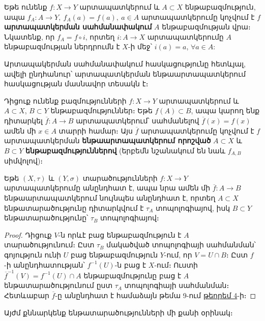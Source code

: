 \documentclass[./main.tex]{subfiles}
\begin{document}
\par Եթե ունենք $f: X\rightarrow Y$ արտապատկերում և $A \subset X$ ենթաբազմություն, ապա $f_A:A \rightarrow Y,\ f_A (a)=f(a),\ a \in A$ արտապատկերումը կոչվում է $f$ \textbf{արտապատկեր\-ման սահմանափակում}  $A$ ենթաբազմության վրա։ Նկատենք, որ $f_A=f\circ i$, որտեղ ${i:A \rightarrow X}$ արտապատկերումը $A$ ենթաբազմության ներդրումն է $X$-ի մեջ՝ $i(a)=a$, $\forall  a \in A$:

\par Արտապակերման սահմանափակում հասկացությունը հետևյալ, ավելի ընդ\-հա\-նուր՝ արտապատկերման ենթաարտապատկերում հասկացության մասնա\-վոր տե\-սակն է։

\par Դիցուք ունենք բազմությունների $f: X \to Y$ արտապատկերում և $A \subset X$, $B \subset Y$ ենթաբազմություններ։ Եթե $f(A) \subset B$, ապա կարող ենք դիտարկել ${\overline{f} : A \to B}$ արտա\-պատկերում՝ սահմանելով $\overline{f}(x) = f(x)$ ամեն մի ${x \in A}$ տարրի համար։ Այս \linebreak $\overline{f}$ արտապատկերումը կոչվում է $f$ արտապատկերման \textbf{ենթաարտապատկերում \linebreak որոշված} $A \subset X$ և $B \subset Y$ \textbf{ենթաբազմություններով} (երբեմն նշանակում են նաև $f_{A, B}$ սիմվոլով)։

\begin{theorem}\label{ch11thm1}
Եթե $(X, \tau)$ և $(Y, \sigma)$ տարածությունների $f : X \to Y$ արտապատ\-կերումը անընդհատ է, ապա նրա ամեն մի $\overline{f}: A \to B$ ենթաարտապատկերում նույնպես անընդհատ է, որտեղ $A \subset X$ ենթատարածությունը դիտարկվում է $\tau_A$ տոպոլոգիայով, իսկ $B \subset Y$ ենթատարածությունը՝ $\tau_B$ տոպոլոգիայով։
\end{theorem}

\begin{proof}
Դիցուք $V$-ն որևէ բաց ենթաբազմություն է $A$ տարածությունում։ Ըստ $\tau_B$ մակածված տոպոլոգիայի սահմանման՝ գոյություն ունի $U$ բաց ենթաբազ\-մություն $Y$-ում, որ $V = U \cap B$։ Ըստ $f$-ի անընդհատության՝ $f^{-1}(U)$-ն բաց է $X$-ում։ Ուստի $\overline{f}^{-1}(V) = f^{-1}(U) \cap A$ ենթաբազմությունը բաց է $A$ ենթատա\-րա\-ծու\-թյու\-նում ըստ $\tau_A$ տոպոլոգիայի սահմանման։ Հետևաբար $\overline{f}$-ը անընդհատ է համաձայն թեմա 9-ում \hyperref[ch9thm4]{թեորեմ 4}-ի։
\end{proof}

\par Այժմ քննարկենք ենթատարածությունների մի քանի օրինակ։ 
\end{document}
